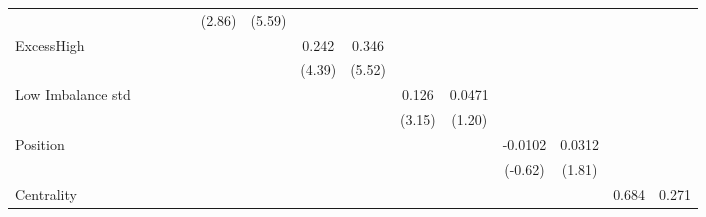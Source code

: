 {\begin{tabular}{l*{14}{c}}
                &                  &                  &                  &                  &   (2.86)         &   (5.59)         &                  &                  &                  &                  &                  &                  &                  &                  \\
[1em]
ExcessHigh      &                  &                  &                  &                  &                  &                  &    0.242\sym{***}&    0.346\sym{***}&                  &                  &                  &                  &                  &                  \\
                &                  &                  &                  &                  &                  &                  &   (4.39)         &   (5.52)         &                  &                  &                  &                  &                  &                  \\
[1em]
Low Imbalance std&                  &                  &                  &                  &                  &                  &                  &                  &    0.126\sym{**} &   0.0471         &                  &                  &                  &                  \\
                &                  &                  &                  &                  &                  &                  &                  &                  &   (3.15)         &   (1.20)         &                  &                  &                  &                  \\
[1em]
Position        &                  &                  &                  &                  &                  &                  &                  &                  &                  &                  &  -0.0102         &   0.0312         &                  &                  \\
                &                  &                  &                  &                  &                  &                  &                  &                  &                  &                  &  (-0.62)         &   (1.81)         &                  &                  \\
[1em]
Centrality      &                  &                  &                  &                  &                  &                  &                  &                  &                  &                  &                  &                  &    0.684\sym{***}&    0.271         \\

\end{tabular}}
